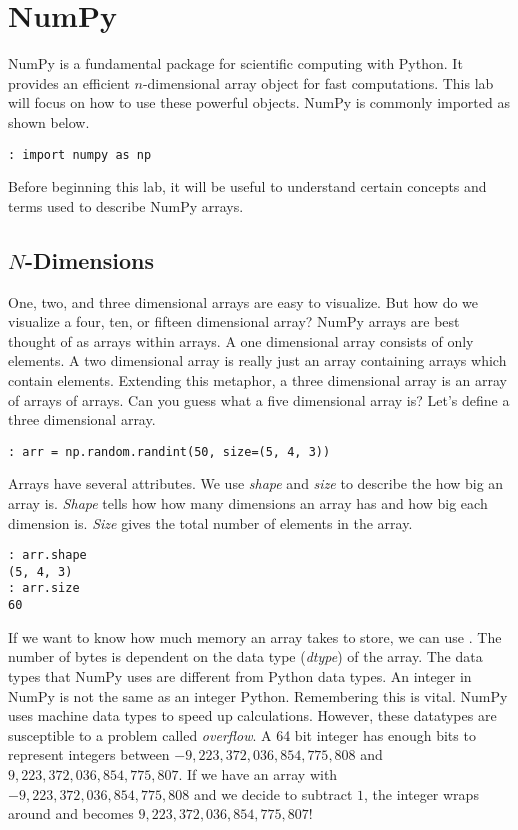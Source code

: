 \section*{NumPy}
NumPy is a fundamental package for scientific computing with Python.  It provides an efficient $n$-dimensional array object for fast computations.  This lab will focus on how to use these powerful objects.  NumPy is commonly imported as shown below.

\begin{lstlisting}
: import numpy as np
\end{lstlisting}
Before beginning this lab, it will be useful to understand certain concepts and terms used to describe NumPy arrays.

\subsection*{$N$-Dimensions}
One, two, and three dimensional arrays are easy to visualize.  But how do we visualize a four, ten, or fifteen dimensional array?  NumPy arrays are best thought of as arrays within arrays.  A one dimensional array consists of only elements.  A two dimensional array is really just an array containing arrays which contain elements.  Extending this metaphor, a three dimensional array is an array of arrays of arrays.  Can you guess what a five dimensional array is?  Let's define a three dimensional array.

\begin{lstlisting}
: arr = np.random.randint(50, size=(5, 4, 3))
\end{lstlisting}

Arrays have several attributes.  We use \emph{shape} and \emph{size} to describe the how big an array is.  \emph{Shape} tells how how many dimensions an array has and how big each dimension is.  \emph{Size} gives the total number of elements in the array.

\begin{lstlisting}
: arr.shape
(5, 4, 3)
: arr.size
60
\end{lstlisting}

If we want to know how much memory an array takes to store, we can use .  The number of bytes is dependent on the data type (\emph{dtype}) of the array.  The data types that NumPy uses are different from Python data types.  An integer in NumPy is not the same as an integer Python.  Remembering this is vital.  NumPy uses machine data types to speed up calculations.  However, these datatypes are susceptible to a problem called \emph{overflow}.  A 64 bit integer has enough bits to represent integers between $-9,223,372,036,854,775,808$ and $9,223,372,036,854,775,807$.  If we have an array with $-9,223,372,036,854,775,808$ and we decide to subtract $1$, the integer wraps around and becomes $9,223,372,036,854,775,807$!  

